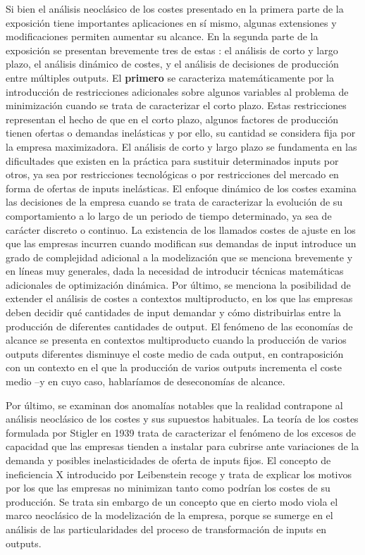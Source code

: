 \documentclass{nuevotema}
\begin{document}
Si bien el análisis neoclásico de los costes presentado en la primera parte de la exposición tiene importantes aplicaciones en sí mismo, algunas extensiones y modificaciones permiten aumentar su alcance. En la segunda parte de la exposición se presentan brevemente tres de estas : el análisis de corto y largo plazo, el análisis dinámico de costes, y el análisis de decisiones de producción entre múltiples outputs. El \textbf{primero} se caracteriza matemáticamente por la introducción de restricciones adicionales sobre algunos variables al problema de minimización cuando se trata de caracterizar el corto plazo. Estas restricciones representan el hecho de que en el corto plazo, algunos factores de producción tienen ofertas o demandas inelásticas y por ello, su cantidad se considera fija por la empresa maximizadora. El análisis de corto y largo plazo se fundamenta en las dificultades que existen en la práctica para sustituir determinados inputs por otros, ya sea por restricciones tecnológicas o por restricciones del mercado en forma de ofertas de inputs inelásticas. El enfoque dinámico de los costes examina las decisiones de la empresa cuando se trata de caracterizar la evolución de su comportamiento a lo largo de un periodo de tiempo determinado, ya sea de carácter discreto o continuo. La existencia de los llamados costes de ajuste en los que las empresas incurren cuando modifican sus demandas de input introduce un grado de complejidad adicional a la modelización que se menciona brevemente y en líneas muy generales, dada la necesidad de introducir técnicas matemáticas adicionales de optimización dinámica. Por último, se menciona la posibilidad de extender el análisis de costes a contextos multiproducto, en los que las empresas deben decidir qué cantidades de input demandar y cómo distribuirlas entre la producción de diferentes cantidades de output. El fenómeno de las economías de alcance se presenta en contextos multiproducto cuando la producción de varios outputs diferentes disminuye el coste medio de cada output, en contraposición con un contexto en el que la producción de varios outputs incrementa el coste medio --y en cuyo caso, hablaríamos de deseconomías de alcance.

Por último, se examinan dos anomalías notables que la realidad contrapone al análisis neoclásico de los costes y sus supuestos habituales. La teoría de los costes formulada por Stigler en 1939 trata de caracterizar el fenómeno de los excesos de capacidad que las empresas tienden a instalar para cubrirse ante variaciones de la demanda y posibles inelasticidades de oferta de inputs fijos. El concepto de ineficiencia X introducido por Leibenstein recoge y trata de explicar los motivos por los que las empresas no minimizan tanto como podrían los costes de su producción. Se trata sin embargo de un concepto que en cierto modo viola el marco neoclásico de la modelización de la empresa, porque se sumerge en el análisis de las particularidades del proceso de transformación de inputs en outputs.
\end{document}
